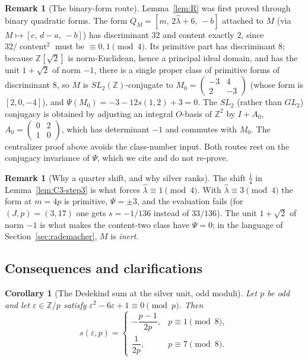 \documentclass[11pt]{article}
\newtheorem{corollary}[theorem]{Corollary}
\theoremstyle{definition}
\newtheorem{remark}[theorem]{Remark}
\DeclareMathOperator{\content}{content}
\newcommand{\Z}{\mathbb Z}
\begin{document}
\begin{remark}[The binary-form route]
\label{rem:class-number-route}
Lemma~\ref{lem:R} was first proved through binary quadratic forms.  The
form $Q_M=[m,\,2\hat\lambda+6,\,-b]$ attached to $M$ (via
$M\mapsto[c,\,d-a,\,-b]$) has discriminant $32$ and content exactly $2$,
since $32/\content^2$ must be $\equiv0,1\pmod4$.  Its primitive part has
discriminant $8$; because $\Z[\sqrt2]$ is norm-Euclidean, hence a
principal ideal domain, and has the unit $1+\sqrt2$ of norm $-1$, there
is a single proper class of primitive forms of discriminant $8$, so $M$
is $SL_2(\Z)$-conjugate to $M_0=\begin{pmatrix}-3&4\\2&-3\end{pmatrix}$
(whose form is $[2,0,-4]$), and $\Psi(M_0)=-3-12s(1,2)+3=0$.  The
$SL_2$ (rather than $GL_2$) conjugacy is obtained by adjusting an
integral $O$-basis of $\Z^2$ by $I+A_0$, $A_0=\begin{pmatrix}0&2\\1&0\end{pmatrix}$,
which has determinant $-1$ and commutes with $M_0$.  The centralizer
proof above avoids the class-number input.  Both routes rest on the
conjugacy invariance of $\Psi$, which we cite and do not re-prove.
\end{remark}

\begin{remark}[Why a quarter shift, and why silver ranks]
The shift $\tfrac14$ in Lemma~\ref{lem:C3-step3} is what forces
$\hat\lambda\equiv1\pmod4$.  With $\hat\lambda\equiv3\pmod4$ the form at
$m=4p$ is primitive, $\Psi=\pm3$, and the evaluation fails (for
$(J,p)=(3,17)$ one gets $s=-1/136$ instead of $33/136$).  The unit
$1+\sqrt2$ of norm $-1$ is what makes the content-two class have
$\Psi=0$; in the language of Section~\ref{sec:rademacher}, $M$ is
\emph{inert}.
\end{remark}

\subsection{Consequences and clarifications}

\begin{corollary}[The Dedekind sum at the silver unit, odd moduli]
\label{cor:S}
Let $p$ be odd and let $\varepsilon\in\Z/p$ satisfy
$\varepsilon^2-6\varepsilon+1\equiv0\pmod p$.  Then
\[
 s(\varepsilon,p)=
 \begin{cases}-\dfrac{p-1}{2p},&p\equiv1\pmod8,\\[6pt]
 \dfrac1{2p},&p\equiv7\pmod8.\end{cases}
\]
\end{corollary}
\end{document}
